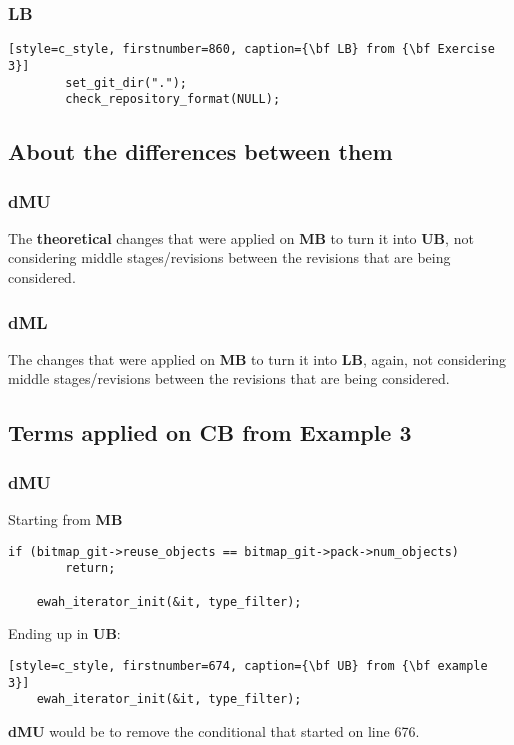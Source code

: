 \subsubsection*{LB}
\begin{lstlisting}[style=c_style, firstnumber=860, caption={\bf LB} from {\bf Exercise 3}]
		set_git_dir(".");
		check_repository_format(NULL);
\end{lstlisting}

\subsection{About the differences between them}
\subsubsection{dMU}
The {\bf theoretical} changes that were applied on {\bf MB} to turn it into {\bf UB}, not considering
middle stages/revisions between the revisions that are being considered.

\subsubsection{dML}
The changes that were applied on {\bf MB} to turn it into {\bf LB}, again, not considering
middle stages/revisions between the revisions that are being considered.

\subsection{Terms applied on CB from Example 3}
\subsubsection{dMU}
Starting from {\bf MB}
\begin{lstlisting}[style=c_style, firstnumber=676, caption=One {\bf MB} from {\bf example 3}]
	if (bitmap_git->reuse_objects == bitmap_git->pack->num_objects)
		return;

	ewah_iterator_init(&it, type_filter);
\end{lstlisting}
Ending up in {\bf UB}:
\begin{lstlisting}[style=c_style, firstnumber=674, caption={\bf UB} from {\bf example 3}]
	ewah_iterator_init(&it, type_filter);
\end{lstlisting}

{\bf dMU} would be to remove the conditional that started on line 676.

